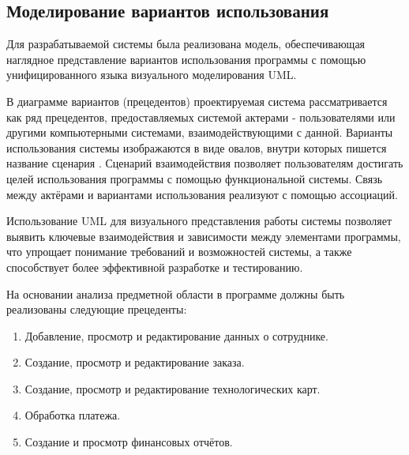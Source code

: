 \newpage
\subsection{Моделирование вариантов использования}

Для разрабатываемой системы была реализована модель, обеспечивающая наглядное представление вариантов использования программы с помощью унифицированного языка визуального моделирования UML. 

В диаграмме вариантов (прецедентов) проектируемая система рассматривается как ряд прецедентов, предоставляемых системой актерами - пользователями или другими компьютерными системами, взаимодействующими с данной. Варианты использования системы изображаются в виде овалов, внутри которых пишется название сценария \cite{uml}. Сценарий взаимодействия позволяет пользователям достигать целей использования программы с помощью функциональной системы. Связь между актёрами и вариантами использования реализуют с помощью ассоциаций. 

Использование UML для визуального представления работы системы позволяет выявить ключевые взаимодействия и зависимости между элементами программы, что упрощает понимание требований и возможностей системы, а также способствует более эффективной разработке и тестированию. 

На основании анализа предметной области в программе должны быть реализованы следующие прецеденты:
\begin{enumerate}
\item Добавление, просмотр и редактирование данных о сотруднике.
\item Создание, просмотр и редактирование заказа.
\item Создание, просмотр и редактирование технологических карт.
\item Обработка платежа.
\item Создание и просмотр финансовых отчётов.
\end{enumerate}

